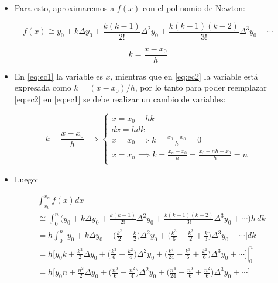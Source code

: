 \documentclass[openany]{book}
\providecommand{\tightlist}{%
  \setlength{\itemsep}{0pt}\setlength{\parskip}{0pt}}
\begin{document}
\begin{itemize}
\tightlist
\item
  Para esto, aproximaremos a \(f(x)\) con el polinomio de Newton:
\end{itemize}

\begin{equation}
\label{eq:ec2}
f(x) \cong y_0 + k \Delta y_0 + \frac{k(k-1)}{2!}\Delta^2 y_0 + \frac{k(k-1)(k-2)}{3!}\Delta^3 y_0 + \cdots
\end{equation}

\[
k = \frac{x-x_0}{h}
\]

\begin{itemize}
\tightlist
\item
  En \eqref{eq:ec1} la variable es \(x\), mientras que en \eqref{eq:ec2} la variable está expresada como \(k = (x - x_0)/h\), por lo tanto para poder reemplazar \eqref{eq:ec2} en \eqref{eq:ec1} se debe realizar un cambio de variables:
\end{itemize}

\[
k = \frac{x-x_0}{h} \implies
\begin{cases}
x = x_0 + hk \\
dx = hdk \\
x = x_0 \implies k = \frac{x_0-x_0}{h} = 0 \\
x = x_n \implies k = \frac{x_n-x_0}{h} = \frac{x_0 + nh -x_0}{h} =n \\
\end{cases}
\]

\begin{itemize}
\tightlist
\item
  Luego:
\end{itemize}

\[
\begin{aligned}
& \int_{x_0}^{x_n} f(x)dx \\
& \cong \int_{0}^{n} \Big( y_0 + k \Delta y_0 + \frac{k(k-1)}{2!}\Delta^2 y_0 + \frac{k(k-1)(k-2)}{3!}\Delta^3 y_0 + \cdots \Big) h\,dk \\
& = h \int_{0}^{n} \Big[ y_0 + k \Delta y_0 + \Big( \frac{k^2}{2} - \frac{k}{2} \Big) \Delta^2 y_0 + \Big( \frac{k^3}{6} - \frac{k^2}{2} + \frac{k}{3} \Big) \Delta^3 y_0  + \cdots \Big] dk \\
&= h \Big[ 
\left.
y_0 k + \frac{k^2}{2} \Delta y_0 + \Big( \frac{k^3}{6} - \frac{k^2}{4} \Big) \Delta^2 y_0 + \Big( \frac{k^4}{24} - \frac{k^3}{6} + \frac{k^2}{6} \Big) \Delta^3 y_0  + \cdots
\Big] \right\vert_{0}^{n} \\
&= h \Big[ y_0 n + \frac{n^2}{2} \Delta y_0 + \Big( \frac{n^3}{6} - \frac{n^2}{4} \Big) \Delta^2 y_0 + \Big( \frac{n^4}{24} - \frac{n^3}{6} + \frac{n^2}{6} \Big) \Delta^3 y_0  + \cdots
\Big]
\end{aligned}
\]
\end{document}
